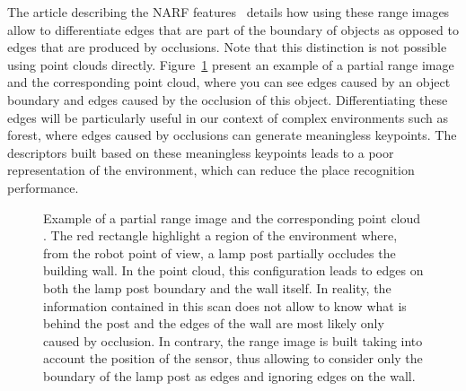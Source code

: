 The article describing the NARF features~\citep{Steder2011a} details how using these range images allow to differentiate edges that are part of the boundary of objects as opposed to edges that are produced by occlusions. Note that this distinction is not possible using point clouds directly. Figure~\ref{fig:chap_slam_edges} present an example of a partial range image and the corresponding point cloud, where you can see edges caused by an object boundary and edges caused by the occlusion of this object. Differentiating these edges will be particularly useful in our context of complex environments such as forest, where edges caused by occlusions can generate meaningless keypoints. The descriptors built based on these meaningless keypoints leads to a poor representation of the environment, which can reduce the place recognition performance.

\begin{figure}[H]
    \centering
    \caption{Example of a partial range image \protect{} and the corresponding point cloud \protect{}. The red rectangle highlight a region of the environment where, from the robot point of view, a lamp post partially occludes the building wall. In the point cloud, this configuration leads to edges on both the lamp post boundary and the wall itself. In reality, the information contained in this scan does not allow to know what is behind the post and the edges of the wall are most likely only caused by occlusion. In contrary, the range image is built taking into account the position of the sensor, thus allowing to consider only the boundary of the lamp post as edges and ignoring edges on the wall.}
    \label{fig:chap_slam_edges}
\end{figure}

